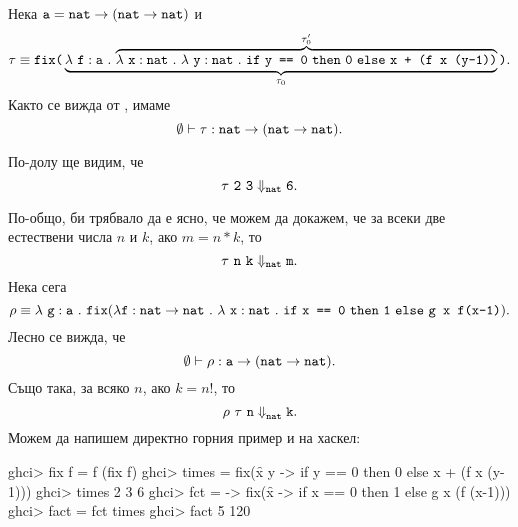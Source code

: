 \begin{example}
  Нека $\texttt{a} = \texttt{nat} \to (\texttt{nat} \to \texttt{nat})$ и 
  \[\tau \equiv \texttt{fix}\texttt{(}\underbrace{\lambda~\texttt{f}:\texttt{a}~.~{\overbrace{\lambda~\texttt{x}:\texttt{nat}~.~{\lambda~\texttt{y}:\texttt{nat}~.~{\texttt{if}\ \texttt{y == 0}\ \texttt{then}\ \texttt{0}\ \texttt{else}\ \texttt{x + (f x (y-1))}}}}^{\tau'_0}}}_{\tau_0}\texttt{)}.\]
  Както се вижда от , имаме 
  \[\emptyset \vdash \tau:\texttt{nat} \to (\texttt{nat} \to \texttt{nat}).\]

  По-долу ще видим, че
  \[\tau\ \vv{2}\ \vv{3} \Downarrow_{\vv{nat}} \vv{6}.\]
  
  По-общо, би трябвало да е ясно, че можем да докажем, че за всеки две естествени числа $n$ и $k$, ако $m = n * k$, то
  \[\tau\ \texttt{n}\ \texttt{k} \Downarrow_{\texttt{nat}} \texttt{m}.\]
  Нека сега
  \[\rho \equiv \lambda~\texttt{g}:\texttt{a}~.~{\texttt{fix}(\lambda \texttt{f} : \texttt{nat}\to\texttt{nat}\ .\ \lambda~\texttt{x}:\texttt{nat}~.~{\texttt{if}\ \texttt{x == 0}\ \texttt{then}\ \texttt{1}\ \texttt{else}\ \texttt{g x f(x-1)}}}).\]
  Лесно се вижда, че
  \[\emptyset \vdash \rho : \texttt{a} \to (\texttt{nat} \to \texttt{nat}).\]
  Също така, за всяко $n$, ако $k = n!$, то
  \[ \rho\ \tau\ \texttt{n} \Downarrow^{}_{\texttt{nat}} \texttt{k}.\]
  Можем да напишем директно горния пример и на хаскел:
\begin{haskellcode}
ghci> fix f = f (fix f)
ghci> times = fix(\f x y -> if y == 0 then 0 else x + (f x (y-1)))
ghci> times 2 3
6
ghci> fct = \g -> fix(\f x -> if x == 0 then 1 else g x (f (x-1)))
ghci> fact = fct times
ghci> fact 5
120
\end{haskellcode}
\end{example}

\def\extraVskip{4pt}

